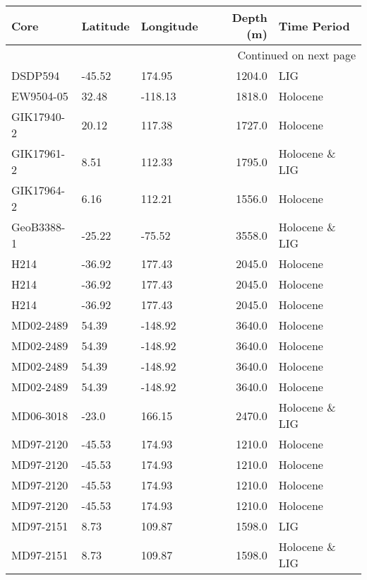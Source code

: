 \begin{longtable}{lllrl}

       Core & Latitude & Longitude &  Depth (m) &     Time Period \\

\endhead

\multicolumn{5}{r}{{Continued on next page}} \\

\endfoot


\endlastfoot
    DSDP594 &   -45.52 &    174.95 &     1204.0 &             LIG \\
  EW9504-05 &    32.48 &   -118.13 &     1818.0 &        Holocene \\
 GIK17940-2 &    20.12 &    117.38 &     1727.0 &        Holocene \\
 GIK17961-2 &     8.51 &    112.33 &     1795.0 &  Holocene \& LIG \\
 GIK17964-2 &     6.16 &    112.21 &     1556.0 &        Holocene \\
 GeoB3388-1 &   -25.22 &    -75.52 &     3558.0 &  Holocene \& LIG \\
       H214 &   -36.92 &    177.43 &     2045.0 &        Holocene \\
       H214 &   -36.92 &    177.43 &     2045.0 &        Holocene \\
       H214 &   -36.92 &    177.43 &     2045.0 &        Holocene \\
  MD02-2489 &    54.39 &   -148.92 &     3640.0 &        Holocene \\
  MD02-2489 &    54.39 &   -148.92 &     3640.0 &        Holocene \\
  MD02-2489 &    54.39 &   -148.92 &     3640.0 &        Holocene \\
  MD02-2489 &    54.39 &   -148.92 &     3640.0 &        Holocene \\
  MD06-3018 &    -23.0 &    166.15 &     2470.0 &  Holocene \& LIG \\
  MD97-2120 &   -45.53 &    174.93 &     1210.0 &        Holocene \\
  MD97-2120 &   -45.53 &    174.93 &     1210.0 &        Holocene \\
  MD97-2120 &   -45.53 &    174.93 &     1210.0 &        Holocene \\
  MD97-2120 &   -45.53 &    174.93 &     1210.0 &        Holocene \\
  MD97-2151 &     8.73 &    109.87 &     1598.0 &             LIG \\
  MD97-2151 &     8.73 &    109.87 &     1598.0 &  Holocene \& LIG \\

\end{longtable}
